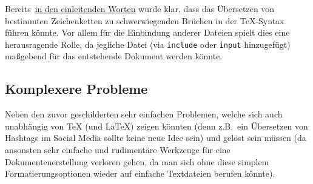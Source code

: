 Bereits~\hyperref[einleitung:inclusion]{in den einleitenden Worten} wurde klar, dass das Übersetzen von bestimmten Zeichenketten zu schwerwiegenden Brüchen in der \TeX{}-Syntax führen könnte. Vor allem für die Einbindung anderer Dateien spielt dies eine herausragende Rolle, da jegliche Datei (via \texttt{include} oder \texttt{input} hinzugefügt) maßgebend für das entstehende Dokument werden könnte.



\newpage
\subsection{Komplexere Probleme}
Neben den zuvor geschilderten sehr einfachen Problemen, welche sich auch unabhängig von \TeX{} (und \LaTeX{}) zeigen könnten (denn z.B.\ ein Übersetzen von Hashtags im Social Media sollte keine neue Idee sein) und gelöst sein müssen (da ansonsten sehr einfache und rudimentäre Werkzeuge für eine Dokumentenerstellung verloren gehen, da man sich ohne diese simplem Formatierungsoptionen wieder auf einfache Textdateien berufen könnte).%


